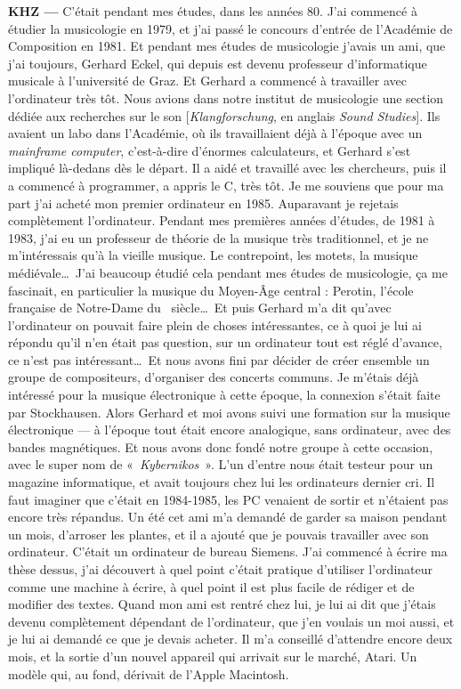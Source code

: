 \documentclass[a4paper,12pt]{article}
\newcommand{\guill}[1]{«~#1~»}
\begin{document}
\textbf{KHZ ---} C'était pendant mes études, dans les années 80. J'ai commencé à étudier la musicologie en 1979, et j'ai passé le concours d'entrée de l'Académie de Composition en 1981. Et pendant mes études de musicologie j'avais un ami, que j'ai toujours, Gerhard Eckel, qui depuis est devenu professeur d'informatique musicale à l'université de Graz. Et Gerhard a commencé à travailler avec l'ordinateur très tôt. Nous avions dans notre institut de musicologie une section dédiée aux recherches sur le son [\emph{Klangforschung}, en anglais \emph{Sound Studies}]. Ils avaient un labo dans l'Académie, où ils travaillaient déjà à l'époque avec un \emph{mainframe computer}, c'est-à-dire d'énormes calculateurs, et Gerhard s'est impliqué là-dedans dès le départ. Il a aidé et travaillé avec les chercheurs, puis il a commencé à programmer, a appris le C, très tôt. Je me souviens que pour ma part j'ai acheté mon premier ordinateur en 1985. Auparavant je rejetais complètement l'ordinateur. Pendant mes premières années d'études, de 1981 à 1983, j'ai eu un professeur de théorie de la musique très traditionnel, et je ne m'intéressais qu'à la vieille musique. Le contrepoint, les motets, la musique médiévale\dots~J'ai beaucoup étudié cela pendant mes études de musicologie, ça me fascinait, en particulier la musique du Moyen-Âge central : Perotin, l'école française de Notre-Dame du \XIIIe~siècle\dots~Et puis Ger\-hard m'a dit qu'avec l'ordinateur on pouvait faire plein de choses intéressantes, ce à quoi je lui ai répondu qu'il n'en était pas question, sur un ordinateur tout est réglé d'avance, ce n'est pas intéressant\dots~Et nous avons fini par décider de créer ensemble un groupe de compositeurs, d'organiser des concerts communs. Je m'étais déjà intéressé pour la musique électronique à cette époque, la connexion s'était faite par Stockhausen. Alors Gerhard et moi avons suivi une formation sur la musique électronique --- à l'époque tout était encore analogique, sans ordinateur, avec des bandes magnétiques. Et nous avons donc fondé notre groupe à cette occasion, avec le super nom de \guill{\emph{Kybernikos}}. L'un d'entre nous était testeur pour un magazine informatique, et avait toujours chez lui les ordinateurs dernier cri. Il faut imaginer que c'était en 1984-1985, les PC venaient de sortir et n'étaient pas encore très répandus. Un été cet ami m'a demandé de garder sa maison pendant un mois, d'arroser les plantes, et il a ajouté que je pouvais travailler avec son ordinateur. C'était un ordinateur de bureau Siemens. J'ai commencé à écrire ma thèse dessus, j'ai découvert à quel point c'était pratique d'utiliser l'ordinateur comme une machine à écrire, à quel point il est plus facile de rédiger et de modifier des textes. Quand mon ami est rentré chez lui, je lui ai dit que j'étais devenu complètement dépendant de l'ordinateur, que j'en voulais un moi aussi, et je lui ai demandé ce que je devais acheter. Il m'a conseillé d'attendre encore deux mois, et la sortie d'un nouvel appareil qui arrivait sur le marché, Atari. Un modèle qui, au fond, dérivait de l'Apple Macintosh. %
\end{document}
